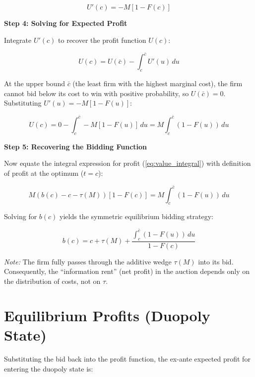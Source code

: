 \documentclass[12pt]{article}
\begin{document}
\begin{equation}
    U'(c) = -M[1 - F(c)]
\end{equation}

\textbf{Step 4: Solving for Expected Profit} \vspace{1em}

Integrate $U'(c)$ to recover the profit function $U(c)$:

\begin{equation}
    U(c) = U(\bar{c}) - \int_{c}^{\bar{c}} U'(u) \, du
\end{equation}

At the upper bound $\bar{c}$ (the least firm with the highest marginal cost), the firm cannot bid below its cost to win with positive probability, so $U(\bar{c}) = 0$. Substituting $U'(u) = -M[1 - F(u)]$:

\begin{equation} \label{eq:value_integral}
    U(c) = 0 - \int_{c}^{\bar{c}} -M[1 - F(u)] \, du = M \int_{c}^{\bar{c}} (1 - F(u)) \, du
\end{equation}

\textbf{Step 5: Recovering the Bidding Function} \vspace{1em}

Now equate the integral expression for profit (\ref{eq:value_integral}) with definition of profit at the optimum ($t=c$):

\begin{equation}
    M(b(c) - c - \tau(M))[1 - F(c)] = M \int_{c}^{\bar{c}} (1 - F(u)) \, du
\end{equation}

Solving for $b(c)$ yields the symmetric equilibrium bidding strategy:

\begin{equation} \label{eq:bid_function}
    b(c) = c + \tau(M) + \frac{\int_{c}^{\bar{c}} (1 - F(u)) \, du}{1 - F(c)}
\end{equation}

\textit{Note:} The firm fully passes through the additive wedge $\tau(M)$ into its bid. Consequently, the ``information rent'' (net profit) in the auction depends only on the distribution of costs, not on $\tau$.

\newpage

\section{Equilibrium Profits (Duopoly State)}

Substituting the bid back into the profit function, the ex-ante expected profit for entering the duopoly state is:
\end{document}
